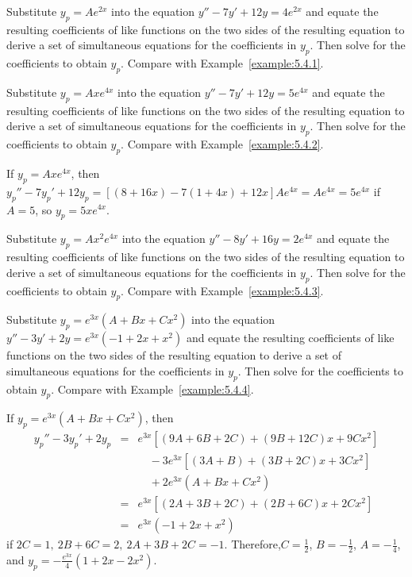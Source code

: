 \documentclass{ximera}
\begin{document}
\begin{problem}\label{exer:5.4.31}  Substitute $y_p=Ae^{2x}$ into the equation $y''-7y'+12y=4e^{2x}$ and equate the resulting coefficients of like functions on the two sides of the resulting equation to derive a set of simultaneous equations for the coefficients in $y_p$. Then
solve for the coefficients to obtain $y_p$.
Compare with Example~\ref{example:5.4.1}.
\end{problem}


\begin{problem}\label{exer:5.4.32}
Substitute $y_p=Axe^{4x}$ into the equation $y''-7y'+12y=5e^{4x}$ and equate the resulting coefficients of like functions on the two sides of the resulting equation to derive a set of simultaneous equations for the coefficients in $y_p$. Then
solve for the coefficients to obtain $y_p$.
Compare with Example~\ref{example:5.4.2}.
\begin{solution}
If $y_p=Axe^{4x}$, then
$y_p''-7y_p'+12y_p=[(8+16x)-7(1+4x)+12x]Ae^{4x}=Ae^{4x}=5e^{4x}$
if $A=5$, so $y_p=5xe^{4x}$.
\end{solution}
\end{problem}

\begin{problem}\label{exer:5.4.33}
Substitute $y_p=Ax^2e^{4x}$ into the equation $y''-8y'+16y=2e^{4x}$ and equate the resulting coefficients of like functions on the two sides of the resulting equation to derive a set of simultaneous equations for the coefficients in $y_p$. Then
solve for the coefficients to obtain $y_p$.
Compare with Example~\ref{example:5.4.3}.
\end{problem}

\begin{problem}\label{exer:5.4.34}
Substitute $y_p=e^{3x}(A+Bx+Cx^2)$ into the equation $y''-3y'+2y=e^{3x}(-1+2x+x^2)$ and equate the resulting coefficients of like functions on the two sides of the resulting equation to derive a set of simultaneous equations for the coefficients in $y_p$. Then
solve for the coefficients to obtain $y_p$.
Compare with Example~\ref{example:5.4.4}.
\begin{solution}
If $y_p=e^{3x}(A+Bx+Cx^2)$, then
\begin{eqnarray*}
y_p''-3y_p'+2y_p&=&e^{3x}[(9A+6B+2C)+(9B+12C)x+9Cx^2]\\
&&\quad-3e^{3x}[(3A+B)+(3B+2C)x+3Cx^2]\\ &&\quad+2e^{3x}(A+Bx+Cx^2)\\
&=&e^{3x}[(2A+3B+2C)+(2B+6C)x+2Cx^2]\\&=& e^{3x}(-1+2x+x^2)
\end{eqnarray*}
if $2C=1,\ 2B+6C=2,\ 2A+3B+2C= -1$. Therefore,$C=\frac{1}{2}$,
$B=-\frac{1}{2}$, $A=-\frac{1}{4}$, and
$y_p=-\frac{e^{3x}}{4}(1+2x-2x^2)$.
\end{solution}
\end{problem}
\end{document}
